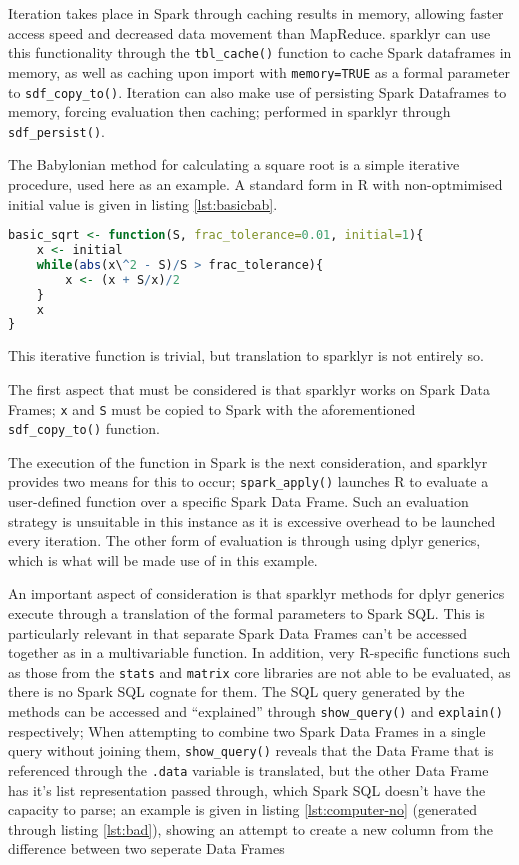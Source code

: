 \documentclass[10pt,a4paper]{article}
\begin{document}
Iteration takes place in Spark through caching results in memory, allowing
faster access speed and decreased data movement than
MapReduce\cite{zaharia2010spark}.
sparklyr can use this functionality through the \texttt{tbl\_cache()} function
to cache Spark dataframes in memory, as well as caching upon import with
\texttt{memory=TRUE} as a formal parameter to \texttt{sdf\_copy\_to()}. 
Iteration can also make use of persisting Spark Dataframes to memory, forcing
evaluation then caching; performed in sparklyr through \texttt{sdf\_persist()}.

The Babylonian method for calculating a square root is a simple iterative
procedure, used here as an example.
A standard form in R with non-optmimised initial value is given in listing
\ref{lst:basicbab}.

\begin{lstlisting}[language=R, caption={Simple Iteration with the Babylonian Method}, label=lst:basicbab]
basic_sqrt <- function(S, frac_tolerance=0.01, initial=1){
	x <- initial
	while(abs(x\^2 - S)/S > frac_tolerance){
		x <- (x + S/x)/2
	}
	x
}
\end{lstlisting}

This iterative function is trivial, but translation to sparklyr is not entirely so.

The first aspect that must be considered is that sparklyr works on Spark Data
Frames;
\texttt{x} and \texttt{S} must be copied to Spark with the aforementioned
\texttt{sdf\_copy\_to()} function.

The execution of the function in Spark is the next consideration, and sparklyr
provides two means for this to occur;
\texttt{spark\_apply()} launches R to evaluate a user-defined function over a
specific Spark Data Frame. 
Such an evaluation strategy is unsuitable in this instance as it is excessive
overhead to be launched every iteration. 
The other form of evaluation is through using dplyr generics, which is what
will be made use of in this example.

An important aspect of consideration is that sparklyr methods for dplyr
generics execute through a translation of the formal parameters to Spark SQL.
This is particularly relevant in that separate Spark Data Frames can't be
accessed together as in a multivariable function.
In addition, very R-specific functions such as those from the \texttt{stats}
and \texttt{matrix} core libraries are not able to be evaluated, as there is no
Spark SQL cognate for them.
The SQL query generated by the methods can be accessed and ``explained''
through \texttt{show\_query()} and \texttt{explain()} respectively;
When attempting to combine two Spark Data Frames in a single query without 
joining them, \texttt{show\_query()} reveals that the Data Frame that is
referenced through the \texttt{.data} variable is translated, but the other
Data Frame has it's list representation passed through, which Spark SQL doesn't
have the capacity to parse; 
an example is given in listing \ref{lst:computer-no} (generated through listing
\ref{lst:bad}), showing an attempt to create a new column from the difference
between two seperate Data Frames
\end{document}
